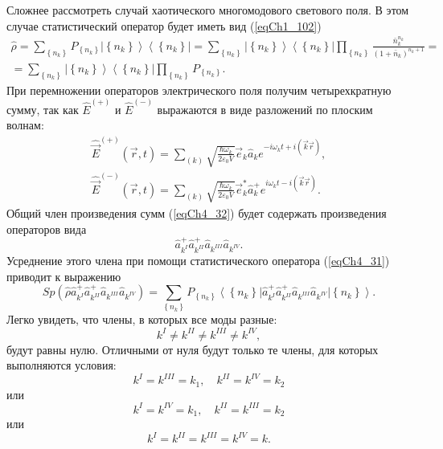 Сложнее рассмотреть случай хаотического многомодового светового
поля. В этом случае статистический оператор будет иметь вид
(\ref{eqCh1_102}) 
\begin{eqnarray}
\hat{\rho} = \sum_{\left\{n_k\right\}} P_{\left\{n_k\right\}} \left|\left\{n_k\right\}\right>\left<\left\{n_k\right\}\right| = 
\sum_{\left\{n_k\right\}} 
 \left|\left\{n_k\right\}\right>\left<\left\{n_k\right\}\right|
\prod_{\left\{n_k\right\}} 
\frac{\bar{n}_k^{n_k}}{\left(1 + \bar{n}_k\right)^{n_k+1}} = 
\nonumber \\
= 
\sum_{\left\{n_k\right\}} 
 \left|\left\{n_k\right\}\right>\left<\left\{n_k\right\}\right|
\prod_{\left\{n_k\right\}} P_{\left\{n_k\right\}}.
\label{eqCh4_31}
\end{eqnarray}
При перемножении операторов электрического поля получим четырехкратную
сумму, так как $\hat{E}^{(+)}$ и $\hat{E}^{(-)}$ выражаются в виде
разложений по плоским волнам: 
\begin{eqnarray}
\hat{\vec{E}}^{(+)}\left(\vec{r}, t\right) = \sum_{(k)}
\sqrt{\frac{\hbar \omega_k}{2 \varepsilon_0 V}} \vec{e}_k \hat{a}_k
e^{-i \omega_k t + i \left(\vec{k} \vec{r}\right)},
\nonumber \\
\hat{\vec{E}}^{(-)}\left(\vec{r}, t\right) = \sum_{(k)}
\sqrt{\frac{\hbar \omega_k}{2 \varepsilon_0 V}} \vec{e}_k^{*} \hat{a}_k^{+}
e^{i \omega_k t - i \left(\vec{k} \vec{r}\right)}.
\label{eqCh4_32}
\end{eqnarray}
Общий член произведения сумм (\ref{eqCh4_32}) будет содержать
произведения операторов вида 
\begin{equation}
\hat{a}^{+}_{k^{I}}\hat{a}^{+}_{k^{II}}\hat{a}_{k^{III}}\hat{a}_{k^{IV}}.
\label{eqCh4_33}
\end{equation}
Усреднение этого члена при помощи статистического оператора
(\ref{eqCh4_31}) приводит к выражению 
\[
Sp\left(\hat{\rho}
\hat{a}^{+}_{k^{I}}\hat{a}^{+}_{k^{II}}\hat{a}_{k^{III}}\hat{a}_{k^{IV}}
\right) = 
\sum_{\left\{n_k\right\}} P_{\left\{n_k\right\}}
\left<\left\{n_k\right\}\right|
\hat{a}^{+}_{k^{I}}\hat{a}^{+}_{k^{II}}\hat{a}_{k^{III}}\hat{a}_{k^{IV}}
\left|\left\{n_k\right\}\right>.
\]
Легко увидеть, что члены, в которых все моды разные: 
\[
k^{I} \neq k^{II} \neq k^{III} \neq k^{IV},
\]
будут равны нулю. Отличными от нуля будут только те члены, для которых
выполняются условия:
\[
k^{I} = k^{III} = k_1, \quad k^{II} = k^{IV} = k_2
\]
или
\[
k^{I} = k^{IV} = k_1, \quad k^{II} = k^{III} = k_2
\]
или
\[
k^{I} = k^{II} =  k^{III} = k^{IV} = k.
\]   

